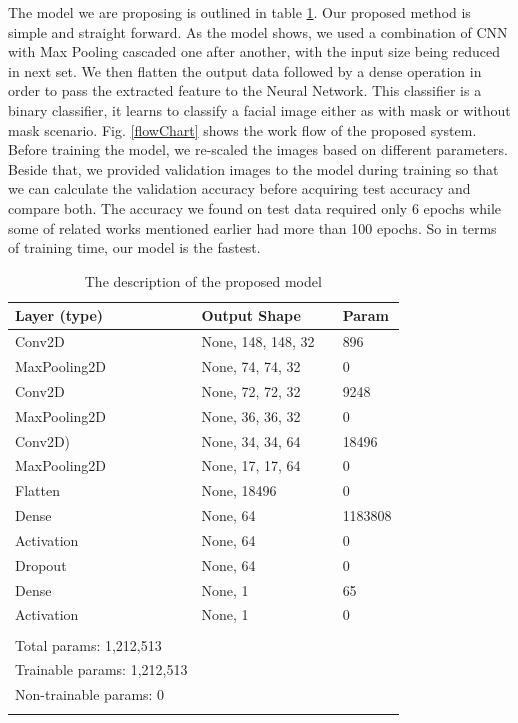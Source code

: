 \documentclass{svproc}
\begin{document}
The model we are proposing is outlined in table \ref{modelTable}. Our proposed method is simple and straight forward. As the model shows, we used a combination of CNN with Max Pooling cascaded one after another, with the input size being reduced in next set. We then flatten the output data followed by a dense operation in order to pass the extracted feature to the Neural Network. This classifier is a binary classifier, it learns to classify a facial image either as with mask or without mask scenario. Fig. \ref{flowChart} shows the work flow of the proposed system. Before training the model, we re-scaled the images based on different parameters. Beside that, we provided validation images to the model during training so that we can calculate the validation accuracy before acquiring test accuracy and compare both. The accuracy we found on test data required only $6$ epochs while some of related works mentioned earlier had more than 100 epochs. So in terms of training time, our model is the fastest.

\begin{table}[!ht]
\centering
\begin{tabular}{llll}
\hline
Layer (type) &  Output Shape & &  Param \\
\hline
Conv2D & None, 148, 148, 32 & & 896 \\
MaxPooling2D & None, 74, 74, 32 & & 0 \\
Conv2D & None, 72, 72, 32 && 9248 \\
MaxPooling2D & None, 36, 36, 32 & & 0 \\
Conv2D) & None, 34, 34, 64 & & 18496 \\
MaxPooling2D & None, 17, 17, 64 & & 0 \\
Flatten & None, 18496 & & 0 \\
Dense & None, 64 & & 1183808 \\
Activation & None, 64 & & 0 \\
Dropout & None, 64 & &  0 \\ 
Dense & None, 1 & &  65 \\
Activation & None, 1 & &  0 \\
\hline \\
Total params: 1,212,513 \\
Trainable params: 1,212,513 \\
Non-trainable params: 0 \\
\hline \\
\end{tabular}
\caption{The description of the proposed model}
\label{modelTable}
\end{table}
\end{document}
